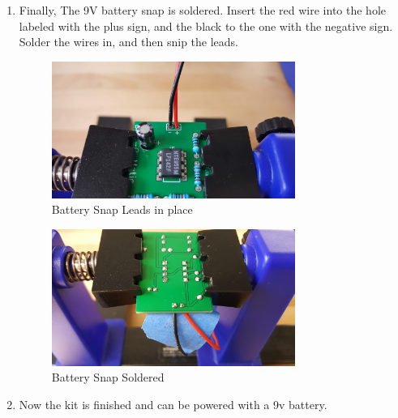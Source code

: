 \documentclass{article}
\begin{document}
\begin{enumerate}
      \item  Finally, The 9V battery snap is soldered. Insert the red wire into the hole labeled with the plus sign, and the black to the one
      with the negative sign. Solder the wires in, and then snip the leads.
      
\begin{figure}[H]
\caption{ Battery Snap Leads in place }
\label{fig:img/0048.jpg}
\centering
\includegraphics[width=0.75\textwidth]{img/0048.jpg}
\end{figure}

      
\begin{figure}[H]
\caption{ Battery Snap Soldered }
\label{fig:img/0050.jpg}
\centering
\includegraphics[width=0.75\textwidth]{img/0050.jpg}
\end{figure}

      \item 
      Now the kit is finished and can be powered with a 9v battery.
      

\end{enumerate}
\end{document}

